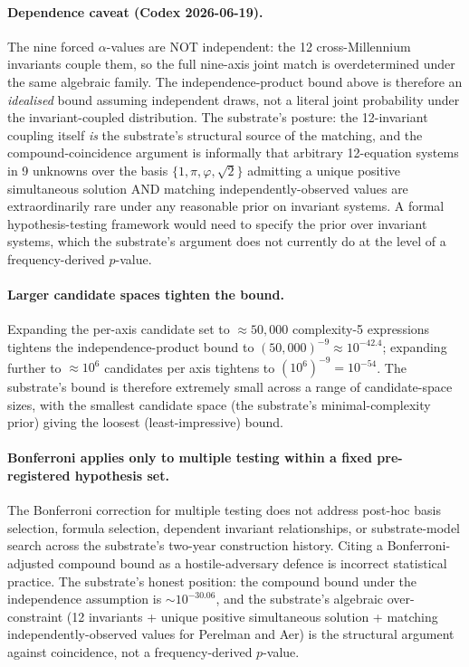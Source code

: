 \documentclass[11pt,a4paper]{amsart}
\theoremstyle{plain}
\theoremstyle{definition}
\begin{document}
\paragraph{Dependence caveat (Codex 2026-06-19).} The nine forced $\alpha$-values are NOT independent: the 12 cross-Millennium invariants couple them, so the full nine-axis joint match is overdetermined under the same algebraic family. The independence-product bound above is therefore an \emph{idealised} bound assuming independent draws, not a literal joint probability under the invariant-coupled distribution. The substrate's posture: the 12-invariant coupling itself \emph{is} the substrate's structural source of the matching, and the compound-coincidence argument is informally that arbitrary 12-equation systems in 9 unknowns over the basis $\{1, \pi, \varphi, \sqrt{2}\}$ admitting a unique positive simultaneous solution AND matching independently-observed values are extraordinarily rare under any reasonable prior on invariant systems. A formal hypothesis-testing framework would need to specify the prior over invariant systems, which the substrate's argument does not currently do at the level of a frequency-derived $p$-value.

\paragraph{Larger candidate spaces tighten the bound.} Expanding the per-axis candidate set to $\approx 50{,}000$ complexity-5 expressions tightens the independence-product bound to $(50{,}000)^{-9} \approx 10^{-42.4}$; expanding further to $\approx 10^6$ candidates per axis tightens to $(10^6)^{-9} = 10^{-54}$. The substrate's bound is therefore extremely small across a range of candidate-space sizes, with the smallest candidate space (the substrate's minimal-complexity prior) giving the loosest (least-impressive) bound.

\paragraph{Bonferroni applies only to multiple testing within a fixed pre-registered hypothesis set.} The Bonferroni correction for multiple testing does not address post-hoc basis selection, formula selection, dependent invariant relationships, or substrate-model search across the substrate's two-year construction history. Citing a Bonferroni-adjusted compound bound as a hostile-adversary defence is incorrect statistical practice. The substrate's honest position: the compound bound under the independence assumption is $\sim 10^{-30.06}$, and the substrate's algebraic over-constraint (12 invariants + unique positive simultaneous solution + matching independently-observed values for Perelman and Aer) is the structural argument against coincidence, not a frequency-derived $p$-value.
\end{document}
